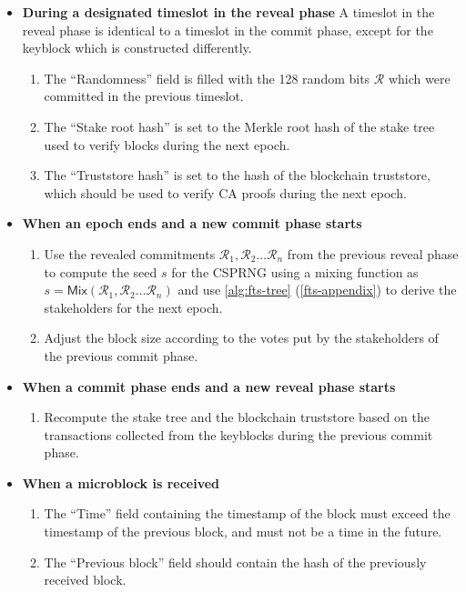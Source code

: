 \documentclass{style/kththesis}
\begin{document}
\begin{appendices}
\begin{itemize}
    \item \textbf{During a designated timeslot in the reveal phase} A timeslot in the reveal phase is identical to a timeslot in the commit phase, except for the keyblock which is constructed differently.
    \begin{enumerate}
        \item The ``Randomness'' field is filled with the 128 random bits $\mathcal{R}$ which were committed in the previous timeslot.
        \item The ``Stake root hash'' is set to the Merkle root hash of the stake tree used to verify blocks during the next epoch.
        \item The ``Truststore hash'' is set to the hash of the blockchain truststore, which should be used to verify CA proofs during the next epoch.
    \end{enumerate}
    \item \textbf{When an epoch ends and a new commit phase starts} 
    \begin{enumerate} 
        \item Use the revealed commitments $\mathcal{R}_1, \mathcal{R}_2\ldots \mathcal{R}_{n}$ from the previous reveal phase to compute the seed $s$ for the CSPRNG using a mixing function as $s = \mathsf{Mix}(\mathcal{R}_1, \mathcal{R}_2\ldots \mathcal{R}_{n})$ and use \cref{alg:fts-tree} (\cref{fts-appendix}) to derive the stakeholders for the next epoch.
        \item Adjust the block size according to the votes put by the stakeholders of the previous commit phase.
    \end{enumerate}
    \item \textbf{When a commit phase ends and a new reveal phase starts}
    \begin{enumerate}
        \item Recompute the stake tree and the blockchain truststore based on the transactions collected from the keyblocks during the previous commit phase.
    \end{enumerate}
    \item \textbf{When a microblock is received}
    \begin{enumerate}
        \item The ``Time'' field containing the timestamp of the block must exceed the timestamp of the previous block, and must not be a time in the future.
        \item The ``Previous block'' field should contain the hash of the previously received block.

\end{enumerate}
\end{itemize}
\end{appendices}
\end{document}
